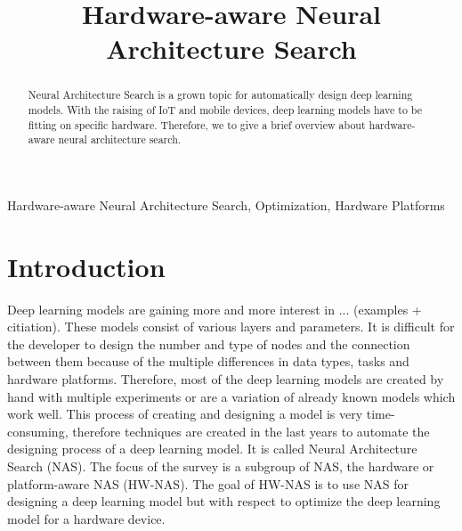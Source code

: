 \documentclass[conference]{IEEEtran}
\begin{document}
\title{Hardware-aware Neural Architecture Search\\}

\author{
}

\maketitle

\begin{abstract}
Neural Architecture Search is a grown topic for automatically design deep learning models. With the raising of IoT and mobile devices, deep learning models have to be fitting on specific hardware. Therefore, we to give a brief overview about hardware-aware neural architecture search. 
\end{abstract}

\begin{IEEEkeywords}
Hardware-aware Neural Architecture Search, Optimization, Hardware Platforms
\end{IEEEkeywords}

\section{Introduction}
\label{section:Introduction}
Deep learning models are gaining more and more interest in ... (examples + citiation). These models consist of various layers and parameters. It is difficult for the developer to design the number and type of nodes and the connection between them because of the multiple differences in data types, tasks and hardware platforms. Therefore, most of the deep learning models are created by hand with multiple experiments or are a variation of already known models which work well. This process of creating and designing a model is very time-consuming, therefore techniques are created in the last years to automate the designing process of a deep learning model. It is called Neural Architecture Search (NAS). The focus of the survey is a subgroup of NAS, the hardware or platform-aware NAS (HW-NAS). The goal of HW-NAS is to use NAS for designing a deep learning model but with respect to optimize the deep learning model for a hardware device. 
\end{document}
